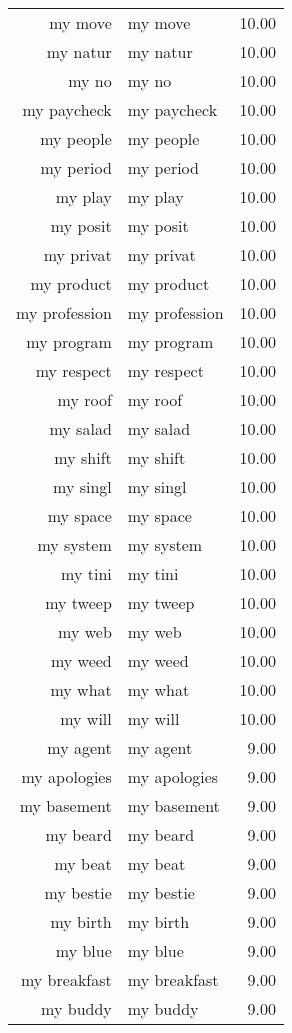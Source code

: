 \begin{table}[ht]
\begin{tabular}{rlr}
  my move & my move & 10.00 \\ 
  my natur & my natur & 10.00 \\ 
  my no & my no & 10.00 \\ 
  my paycheck & my paycheck & 10.00 \\ 
  my people & my people & 10.00 \\ 
  my period & my period & 10.00 \\ 
  my play & my play & 10.00 \\ 
  my posit & my posit & 10.00 \\ 
  my privat & my privat & 10.00 \\ 
  my product & my product & 10.00 \\ 
  my profession & my profession & 10.00 \\ 
  my program & my program & 10.00 \\ 
  my respect & my respect & 10.00 \\ 
  my roof & my roof & 10.00 \\ 
  my salad & my salad & 10.00 \\ 
  my shift & my shift & 10.00 \\ 
  my singl & my singl & 10.00 \\ 
  my space & my space & 10.00 \\ 
  my system & my system & 10.00 \\ 
  my tini & my tini & 10.00 \\ 
  my tweep & my tweep & 10.00 \\ 
  my web & my web & 10.00 \\ 
  my weed & my weed & 10.00 \\ 
  my what & my what & 10.00 \\ 
  my will & my will & 10.00 \\ 
  my agent & my agent & 9.00 \\ 
  my apologies & my apologies & 9.00 \\ 
  my basement & my basement & 9.00 \\ 
  my beard & my beard & 9.00 \\ 
  my beat & my beat & 9.00 \\ 
  my bestie & my bestie & 9.00 \\ 
  my birth & my birth & 9.00 \\ 
  my blue & my blue & 9.00 \\ 
  my breakfast & my breakfast & 9.00 \\ 
  my buddy & my buddy & 9.00 \\ 

\end{tabular}
\end{table}
